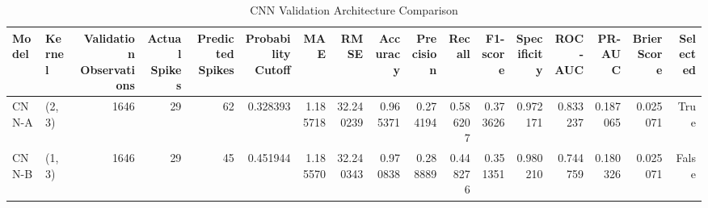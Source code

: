 \begin{table}
\caption{CNN Validation Architecture Comparison}
\label{tab:4.11}
\begin{tabular}{llrrrrrrrrrrrrrrr}
\toprule
Model & Kernel & Validation Observations & Actual Spikes & Predicted Spikes & Probability Cutoff & MAE & RMSE & Accuracy & Precision & Recall & F1-score & Specificity & ROC-AUC & PR-AUC & Brier Score & Selected \\
\midrule
CNN-A & (2, 3) & 1646 & 29 & 62 & 0.328393 & 1.185718 & 32.240239 & 0.965371 & 0.274194 & 0.586207 & 0.373626 & 0.972171 & 0.833237 & 0.187065 & 0.025071 & True \\
CNN-B & (1, 3) & 1646 & 29 & 45 & 0.451944 & 1.185570 & 32.240343 & 0.970838 & 0.288889 & 0.448276 & 0.351351 & 0.980210 & 0.744759 & 0.180326 & 0.025071 & False \\
\bottomrule
\end{tabular}
\end{table}
